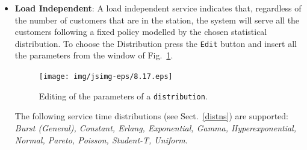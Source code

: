 \begin{itemize}
\item \textbf{Load Independent}: A load independent service
indicates that, regardless of the number of customers that are in
the station, the system will serve all the customers following a
fixed policy modelled by the chosen statistical distribution. To
choose the Distribution press the \texttt{Edit} button and insert
all the parameters from the window of Fig.~\ref{fig:cldistrw}.
\begin{figure}[htb]
    \begin{center}
        \texttt{[image: img/jsimg-eps/8.17.eps]}
    \end{center}
    \caption{Editing of the parameters of a \texttt{distribution}.}
    \label{fig:cldistrw}
\end{figure}

The following service time distributions (see Sect.~\ref{distns})
are supported: \emph{Burst (General), Constant, Erlang,
Exponential, Gamma, Hyperexponential, Normal, Pareto, Poisson,
Student-T, Uniform}.


\end{itemize}
